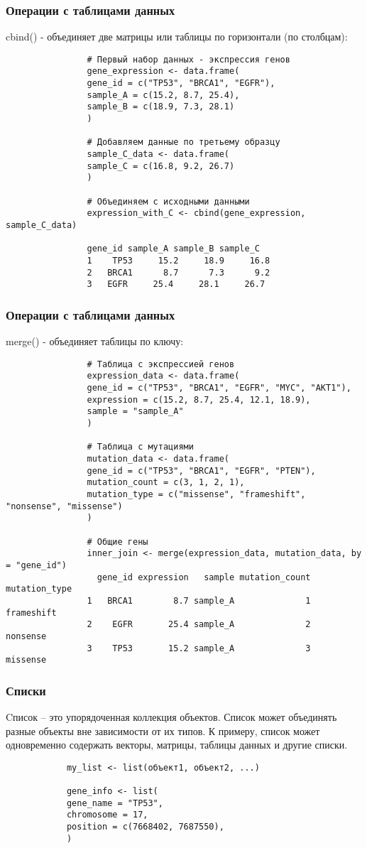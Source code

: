 \documentclass[14pt,a4paper]{beamer}
\begin{document}
	
	\begin{frame}[fragile]
		\frametitle{Операции с таблицами данных}
		cbind() - объединяет две матрицы или таблицы по горизонтали (по столбцам):
		{\fontsize{7}{8}\selectfont	
			\begin{verbatim}
				# Первый набор данных - экспрессия генов
				gene_expression <- data.frame(
				gene_id = c("TP53", "BRCA1", "EGFR"),
				sample_A = c(15.2, 8.7, 25.4),
				sample_B = c(18.9, 7.3, 28.1)
				)
				
				# Добавляем данные по третьему образцу
				sample_C_data <- data.frame(
				sample_C = c(16.8, 9.2, 26.7)
				)
				
				# Объединяем с исходными данными
				expression_with_C <- cbind(gene_expression, sample_C_data)
				
				gene_id sample_A sample_B sample_C
				1    TP53     15.2     18.9     16.8
				2   BRCA1      8.7      7.3      9.2
				3   EGFR     25.4     28.1     26.7		
			\end{verbatim}
		}	
		
	\end{frame}
	
	\begin{frame}[fragile]
		\frametitle{Операции с таблицами данных}
		merge() - объединяет таблицы по ключу:
		{\fontsize{7}{8}\selectfont	
			\begin{verbatim}
				# Таблица с экспрессией генов
				expression_data <- data.frame(
				gene_id = c("TP53", "BRCA1", "EGFR", "MYC", "AKT1"),
				expression = c(15.2, 8.7, 25.4, 12.1, 18.9),
				sample = "sample_A"
				)
				
				# Таблица с мутациями
				mutation_data <- data.frame(
				gene_id = c("TP53", "BRCA1", "EGFR", "PTEN"),
				mutation_count = c(3, 1, 2, 1),
				mutation_type = c("missense", "frameshift", "nonsense", "missense")
				)
				
				# Общие гены
				inner_join <- merge(expression_data, mutation_data, by = "gene_id")
				  gene_id expression   sample mutation_count mutation_type
				1   BRCA1        8.7 sample_A              1    frameshift
				2    EGFR       25.4 sample_A              2      nonsense
				3    TP53       15.2 sample_A              3      missense	
			\end{verbatim}
		}	
		
	\end{frame}
	
	\begin{frame}[fragile]
		\frametitle{Списки}
		Cписок – это упорядоченная коллекция объектов. Список может объединять разные объекты вне зависимости от их типов. К примеру, список может одновременно содержать векторы, матрицы, таблицы данных и другие списки.
		\begin{verbatim}
			my_list <- list(объект1, объект2, ...)
			
			gene_info <- list(
			gene_name = "TP53",
			chromosome = 17,
			position = c(7668402, 7687550),
			)
		\end{verbatim}
	\end{frame}
	
\end{document}
